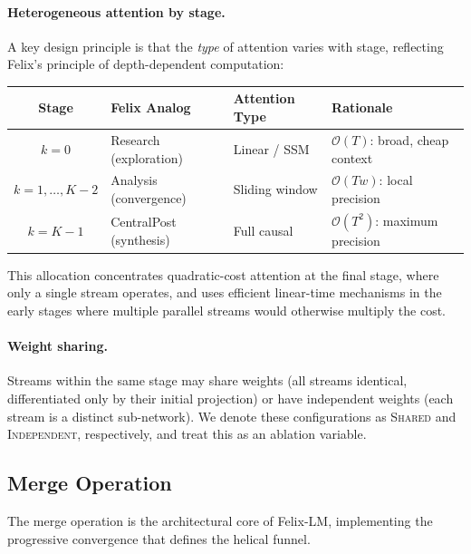 \documentclass[11pt,a4paper]{article}
\theoremstyle{definition}
\theoremstyle{plain}
\theoremstyle{remark}
\newcommand{\Ocal}{\mathcal{O}}
\begin{document}
\paragraph{Heterogeneous attention by stage.}
A key design principle is that the \emph{type} of attention varies with 
stage, reflecting Felix's principle of depth-dependent computation:

\begin{center}
\begin{tabular}{@{}clll@{}}
\toprule
\textbf{Stage} & \textbf{Felix Analog} & \textbf{Attention Type} & 
  \textbf{Rationale} \\
\midrule
$k = 0$ & Research (exploration) & Linear / SSM & 
  $\Ocal(T)$: broad, cheap context \\
$k = 1, \ldots, K{-}2$ & Analysis (convergence) & Sliding window & 
  $\Ocal(Tw)$: local precision \\
$k = K{-}1$ & CentralPost (synthesis) & Full causal & 
  $\Ocal(T^2)$: maximum precision \\
\bottomrule
\end{tabular}
\end{center}

This allocation concentrates quadratic-cost attention at the final stage, 
where only a single stream operates, and uses efficient linear-time 
mechanisms in the early stages where multiple parallel streams would 
otherwise multiply the cost.

\paragraph{Weight sharing.}
Streams within the same stage may share weights (all streams identical, 
differentiated only by their initial projection) or have independent 
weights (each stream is a distinct sub-network). We denote these 
configurations as \textsc{Shared} and \textsc{Independent}, respectively, 
and treat this as an ablation variable.

\subsection{Merge Operation}\label{sec:merge}

The merge operation is the architectural core of Felix-LM, implementing 
the progressive convergence that defines the helical funnel.
\end{document}
